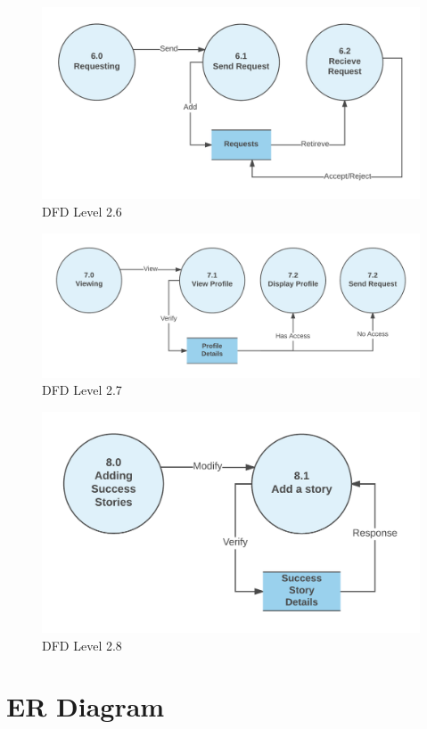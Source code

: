\documentclass[12pt]{report}
\begin{document}
\begin{figure}[!htb]
    \centering
    \includegraphics[width=.8\textwidth]{df-l2-6.png}
    \caption{DFD Level 2.6}
    \label{fig:dfd l2.6}
\end{figure}

\begin{figure}[!htb]
    \centering
    \includegraphics[width=.8\textwidth]{df-l2-7.png}
    \caption{DFD Level 2.7}
    \label{fig:dfd l2.7}
\end{figure}

\begin{figure}[!htb]
    \centering
    \includegraphics[width=.7\textwidth]{df-l2-8.png}
    \caption{DFD Level 2.8}
    \label{fig:dfd l2.8}
\end{figure}


\chapter{ER Diagram}
\end{document}
